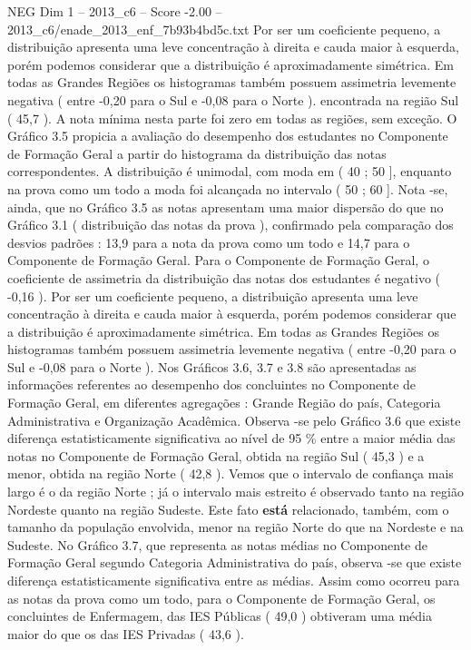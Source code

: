 \begin{textsample}{NEG Dim 1 – 2013\_c6 – Score -2.00 – 2013\_c6/enade\_2013\_enf\_7b93b4bd5c.txt}
Por ser um coeficiente pequeno, a distribuição apresenta uma leve concentração à direita e cauda maior à esquerda, porém podemos considerar que a distribuição é aproximadamente simétrica.
Em todas as Grandes Regiões os histogramas também possuem assimetria levemente negativa ( entre -0,20 para o Sul e -0,08 para o Norte ). encontrada na região Sul ( 45,7 ).
A nota mínima nesta parte foi zero em todas as regiões, sem exceção.
O Gráfico 3.5 propicia a avaliação do desempenho dos estudantes no Componente de Formação Geral a partir do histograma da distribuição das notas correspondentes.
A distribuição é unimodal, com moda em ( 40 ; 50 ], enquanto na prova como um todo a moda foi alcançada no intervalo ( 50 ; 60 ].
Nota -se, ainda, que no Gráfico 3.5 as notas apresentam uma maior dispersão do que no Gráfico 3.1 ( distribuição das notas da prova ), confirmado pela comparação dos desvios padrões : 13,9 para a nota da prova como um todo e 14,7 para o Componente de Formação Geral.
Para o Componente de Formação Geral, o coeficiente de assimetria da distribuição das notas dos estudantes é negativo ( -0,16 ).
Por ser um coeficiente pequeno, a distribuição apresenta uma leve concentração à direita e cauda maior à esquerda, porém podemos considerar que a distribuição é aproximadamente simétrica.
Em todas as Grandes Regiões os histogramas também possuem assimetria levemente negativa ( entre -0,20 para o Sul e -0,08 para o Norte ).
Nos Gráficos 3.6, 3.7 e 3.8 são apresentadas as informações referentes ao desempenho dos concluintes no Componente de Formação Geral, em diferentes agregações : Grande Região do país, Categoria Administrativa e Organização Acadêmica.
Observa -se pelo Gráfico 3.6 que existe diferença estatisticamente significativa ao nível de 95 \% entre a maior média das notas no Componente de Formação Geral, obtida na região Sul ( 45,3 ) e a menor, obtida na região Norte ( 42,8 ).
Vemos que o intervalo de confiança mais largo é o da região Norte ; já o intervalo mais estreito é observado tanto na região Nordeste quanto na região Sudeste.
Este fato \textbf{está} relacionado, também, com o tamanho da população envolvida, menor na região Norte do que na Nordeste e na Sudeste.
No Gráfico 3.7, que representa as notas médias no Componente de Formação Geral segundo Categoria Administrativa do país, observa -se que existe diferença estatisticamente significativa entre as médias.
Assim como ocorreu para as notas da prova como um todo, para o Componente de Formação Geral, os concluintes de Enfermagem, das IES Públicas ( 49,0 ) obtiveram uma média maior do que os das IES Privadas ( 43,6 ).

\end{textsample}
